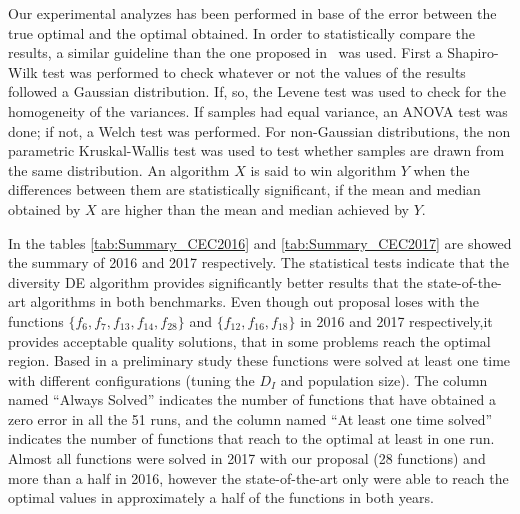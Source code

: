 Our experimental analyzes has been performed in base of the error between the true optimal and the optimal obtained.
%
In order to statistically compare the results, a similar guideline than the one proposed in~\cite{Joel:StatisticalTest} was used. 
%
First a Shapiro-Wilk test was performed to check whatever or not the values of the results followed a Gaussian distribution. 
%
If, so, the Levene test was used to check for the homogeneity of the variances. 
%
If samples had equal variance, an ANOVA test was done; if not, a Welch test was performed. 
%
For non-Gaussian distributions, the non parametric Kruskal-Wallis test was used to test whether samples are drawn from the same distribution. 
%
An algorithm $X$ is said to win algorithm $Y$ when the differences between them are statistically significant, if the mean and median obtained by $X$ are higher than the mean and median achieved by $Y$.

In the tables \ref{tab:Summary_CEC2016} and \ref{tab:Summary_CEC2017} are showed the summary of \CEC{} 2016 and \CEC{} 2017 respectively.
%
The statistical tests indicate that the diversity DE algorithm provides significantly better results that the state-of-the-art algorithms in both benchmarks.
%
Even though out proposal loses with the functions $\{f_6, f_7, f_{13}, f_{14}, f_{28}\}$ and $\{ f_{12}, f_{16}, f_{18} \}$ in \CEC{} 2016 and \CEC{} 2017 respectively,it provides acceptable quality solutions, that in some problems reach the optimal region.
%
Based in a preliminary study these functions were solved at least one time with different configurations (tuning the $D_I$ and population size).
%
The column named ``Always Solved'' indicates the number of functions that have obtained a zero error in all the 51 runs, and the column named ``At least one time solved'' indicates the number of functions that reach to the optimal at least in one run.
%
Almost all functions were solved in \CEC{} 2017 with our proposal (28 functions) and more than a half in \CEC{} 2016, however the state-of-the-art only were able to reach the optimal values in approximately a half of the functions in both years.

